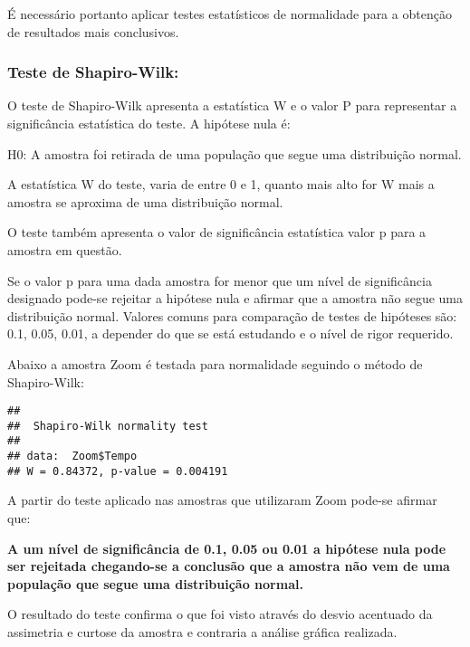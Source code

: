 \documentclass[
]{article}
\newenvironment{Shaded}{\begin{snugshade}}{\end{snugshade}}
\newcommand{\KeywordTok}[1]{\textcolor[rgb]{0.13,0.29,0.53}{\textbf{#1}}}
\newcommand{\NormalTok}[1]{#1}
\newcommand{\OperatorTok}[1]{\textcolor[rgb]{0.81,0.36,0.00}{\textbf{#1}}}
\newcommand{\StringTok}[1]{\textcolor[rgb]{0.31,0.60,0.02}{#1}}
\begin{document}
É necessário portanto aplicar testes estatísticos de normalidade para a
obtenção de resultados mais conclusivos.

\hypertarget{teste-de-shapiro-wilk}{%
\subsubsection{Teste de Shapiro-Wilk:}\label{teste-de-shapiro-wilk}}

O teste de Shapiro-Wilk apresenta a estatística W e o valor P para
representar a significância estatística do teste. A hipótese nula é:

H0: A amostra foi retirada de uma população que segue uma distribuição
normal.

A estatística W do teste, varia de entre 0 e 1, quanto mais alto for W
mais a amostra se aproxima de uma distribuição normal.

O teste também apresenta o valor de significância estatística valor p
para a amostra em questão.

Se o valor p para uma dada amostra for menor que um nível de
significância designado pode-se rejeitar a hipótese nula e afirmar que a
amostra não segue uma distribuição normal. Valores comuns para
comparação de testes de hipóteses são: 0.1, 0.05, 0.01, a depender do
que se está estudando e o nível de rigor requerido.

Abaixo a amostra Zoom é testada para normalidade seguindo o método de
Shapiro-Wilk:

\begin{Shaded}
\end{Shaded}

\begin{verbatim}
## 
##  Shapiro-Wilk normality test
## 
## data:  Zoom$Tempo
## W = 0.84372, p-value = 0.004191
\end{verbatim}

A partir do teste aplicado nas amostras que utilizaram Zoom pode-se
afirmar que:

\textbf{A um nível de significância de 0.1, 0.05 ou 0.01 a hipótese nula
pode ser rejeitada chegando-se a conclusão que a amostra não vem de uma
população que segue uma distribuição normal.}

O resultado do teste confirma o que foi visto através do desvio
acentuado da assimetria e curtose da amostra e contraria a análise
gráfica realizada.
\end{document}
